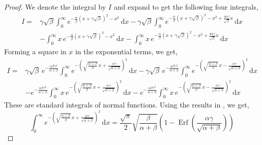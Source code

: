 \documentclass[journal]{IEEEtran}
\theoremstyle{plain}
\theoremstyle{definition}
\theoremstyle{remark}
\newcommand{\Erf}{\operatorname{Erf}}
\newcommand{\dd}{\mathrm{d}}
\begin{document}
\begin{proof}
We denote the integral by $I$ and expand to get the following four integrals,
\begin{equation}
\begin{split}
    I =&  \gamma\sqrt{\beta } \int_{0}^\infty e^{-\frac{\alpha}{\beta}  \left(x + \gamma\sqrt{\beta } \right)^2 - x^2} \, \dd x - \gamma\sqrt{\beta } \int_{0}^\infty e^{-\frac{\alpha}{\beta}  \left(x + \gamma\sqrt{\beta } \right)^2 - x^2 + \frac{4 \alpha  \gamma }{\sqrt{\beta }} x}  \, \dd x \\&
    - \int_{0}^\infty x\, e^{-\frac{\alpha}{\beta}  \left(x + \gamma\sqrt{\beta } \right)^2 - x^2} \, \dd x - \int_{0}^\infty x \, e^{-\frac{\alpha}{\beta}  \left(x + \gamma\sqrt{\beta } \right)^2 - x^2 + \frac{4 \alpha  \gamma }{\sqrt{\beta }} x}  \, \dd x
\end{split}
\end{equation}
Forming a square in $x$ in the exponential terms, we get,
\begin{equation}
\begin{split}
    I =&  \gamma\sqrt{\beta } \, e^{-\frac{\alpha  \beta  \gamma ^2}{\alpha +\beta }} \int_{0}^\infty e^{-\left(\sqrt{\frac{\alpha +\beta }{\beta }} \, x + \frac{\alpha  \gamma }{\sqrt{\alpha +\beta }} \right)^2} \, \dd x - \gamma\sqrt{\beta } \, e^{-\frac{\alpha  \beta  \gamma ^2}{\alpha +\beta }} \int_{0}^\infty e^{-\left(\sqrt{\frac{\alpha +\beta }{\beta }} \, x - \frac{\alpha  \gamma }{\sqrt{\alpha +\beta }} \right)^2}  \, \dd x \\&  - e^{-\frac{\alpha  \beta  \gamma ^2}{\alpha +\beta }} \int_{0}^\infty x\, e^{-\left(\sqrt{\frac{\alpha +\beta }{\beta }} \, x + \frac{\alpha  \gamma }{\sqrt{\alpha +\beta }} \right)^2} \, \dd x   - e^{-\frac{\alpha  \beta  \gamma ^2}{\alpha +\beta }} \int_{0}^\infty x \, e^{-\left(\sqrt{\frac{\alpha +\beta }{\beta }} \, x - \frac{\alpha  \gamma }{\sqrt{\alpha +\beta }} \right)^2}  \, \dd x
\end{split} \label{eq:four_integrals}
\end{equation}
These are standard integrals of normal functions. Using the results in \cite{owen1980table}, we get,
\begin{equation}
    \int_{0}^\infty e^{-\left(\sqrt{\frac{\alpha +\beta }{\beta }} \, x + \frac{\alpha  \gamma }{\sqrt{\alpha +\beta }} \right)^2} \, \dd x = \frac{\sqrt{\pi }}{2} \sqrt{\frac{\beta }{\alpha +\beta }} \left(1 - \Erf\left(\frac{\alpha  \gamma }{\sqrt{\alpha +\beta }}\right)\right)
\end{equation}

\end{proof}
\end{document}
